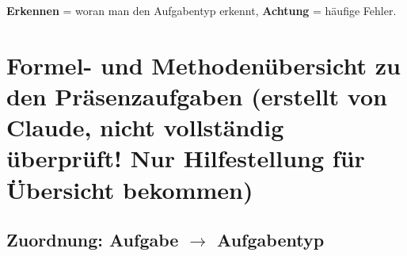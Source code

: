 \textbf{\color{RoyalBlue}Erkennen}
= woran man den Aufgabentyp erkennt, \textbf{\color{RedViolet}Achtung}
= häufige Fehler. 


\section{Formel- und Methodenübersicht zu den Präsenzaufgaben (erstellt von Claude, nicht vollständig überprüft! Nur Hilfestellung für Übersicht bekommen)}
\label{sec:formel--und-methodenubersicht-zu-den-prasenzaufgaben-(erstellt-von-claude-noch-nicht-fertig-uberpruft)}


\subsection{Zuordnung: Aufgabe $\to$ Aufgabentyp}\label{subsec:zuordnung:-aufgabe-$to$-aufgabentyp}

